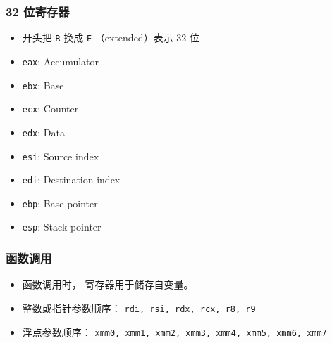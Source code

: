 \subsubsection{32 位寄存器}
\begin{itemize}
\item 开头把 \verb|R| 换成 \verb|E| （extended）表示 32 位
\item \verb|eax|: Accumulator
\item \verb|ebx|: Base
\item \verb|ecx|: Counter
\item \verb|edx|: Data
\item \verb|esi|: Source index
\item \verb|edi|: Destination index
\item \verb|ebp|: Base pointer
\item \verb|esp|: Stack pointer
\end{itemize}

\subsubsection{函数调用}
\begin{itemize}
\item 函数调用时， 寄存器用于储存自变量。
\item 整数或指针参数顺序： \verb|rdi, rsi, rdx, rcx, r8, r9|
\item 浮点参数顺序： \verb|xmm0, xmm1, xmm2, xmm3, xmm4, xmm5, xmm6, xmm7|
\end{itemize}


